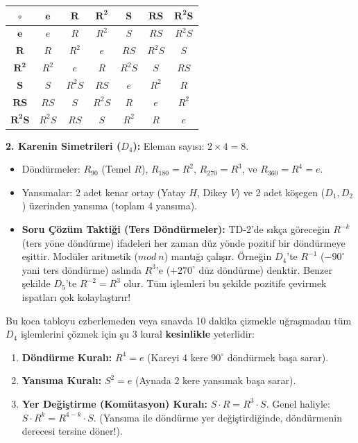 \documentclass[12pt,a4paper]{report}
\begin{document}
\begin{center}
\renewcommand{\arraystretch}{1.5}
\begin{tabular}{|c||c|c|c|c|c|c|}
\hline
$\circ$ & $\mathbf{e}$ & $\mathbf{R}$ & $\mathbf{R^2}$ & $\mathbf{S}$ & $\mathbf{RS}$ & $\mathbf{R^2S}$ \\
\hline\hline
$\mathbf{e}$ & $e$ & $R$ & $R^2$ & $S$ & $RS$ & $R^2S$ \\
\hline
$\mathbf{R}$ & $R$ & $R^2$ & $e$ & $RS$ & $R^2S$ & $S$ \\
\hline
$\mathbf{R^2}$ & $R^2$ & $e$ & $R$ & $R^2S$ & $S$ & $RS$ \\
\hline
$\mathbf{S}$ & $S$ & $R^2S$ & $RS$ & $e$ & $R^2$ & $R$ \\
\hline
$\mathbf{RS}$ & $RS$ & $S$ & $R^2S$ & $R$ & $e$ & $R^2$ \\
\hline
$\mathbf{R^2S}$ & $R^2S$ & $RS$ & $S$ & $R^2$ & $R$ & $e$ \\
\hline
\end{tabular}
\end{center}

\textbf{2. Karenin Simetrileri ($D_4$):}
Eleman sayısı: $2 \times 4 = 8$.
\begin{itemize}
    \item Döndürmeler: $R_{90}$ (Temel $R$), $R_{180} = R^2$, $R_{270} = R^3$, ve $R_{360} = R^4 = e$.
    \item Yansımalar: 2 adet kenar ortay (Yatay $H$, Dikey $V$) ve 2 adet köşegen ($D_1, D_2$) üzerinden yansıma (toplam 4 yansıma).
    \item \textbf{Soru Çözüm Taktiği (Ters Döndürmeler):} TD-2'de sıkça göreceğin $R^{-k}$ (ters yöne döndürme) ifadeleri her zaman düz yönde pozitif bir döndürmeye eşittir. Modüler aritmetik ($mod\ n$) mantığı çalışır.
    Örneğin $D_4$'te $R^{-1}$ ($-90^\circ$ yani ters döndürme) aslında $R^3$'e ($+270^\circ$ düz döndürme) denktir. Benzer şekilde $D_5$'te $R^{-2} = R^3$ olur. Tüm işlemleri bu şekilde pozitife çevirmek ispatları çok kolaylaştırır!
\end{itemize}

\begin{tcolorbox}[colback=purple!5!white,colframe=purple!75!black,title=$D_4$ İçin Altın Kurallar (Sınav Kurtarıcı)]
Bu koca tabloyu ezberlemeden veya sınavda 10 dakika çizmekle uğraşmadan tüm $D_4$ işlemlerini çözmek için şu 3 kural \textbf{kesinlikle} yeterlidir:
\begin{enumerate}
    \item \textbf{Döndürme Kuralı:} $R^4 = e$ (Kareyi 4 kere $90^\circ$ döndürmek başa sarar).
    \item \textbf{Yansıma Kuralı:} $S^2 = e$ (Aynada 2 kere yansımak başa sarar).
    \item \textbf{Yer Değiştirme (Komütasyon) Kuralı:} $S \cdot R = R^3 \cdot S$.
    Genel haliyle: $S \cdot R^k = R^{4-k} \cdot S$. (Yansıma ile döndürme yer değiştirdiğinde, döndürmenin derecesi tersine döner!).
\end{enumerate}
\end{tcolorbox}
\end{document}
